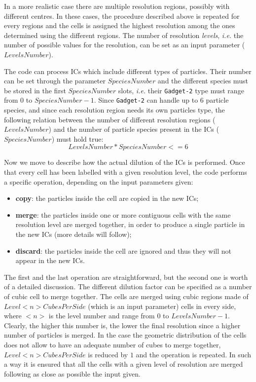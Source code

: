\documentclass[11pt,a4paper,titlepage]{article}
\newcommand{\ie}{\emph{i.e.}\xspace}
\newcommand{\gadget}{\texttt{Gadget-2}\xspace}
\begin{document}
In a more realistic case there are multiple resolution regions, possibly with different centres. In these cases, the procedure described above is repeated for every regions and the cells is assigned the highest resolution among the ones determined using the different regions. The number of resolution \emph{levels}, \ie the number of possible values for the resolution, can be set as an input parameter ($LevelsNumber$).

The code can process ICs which include different types of particles. Their number can be set through the parameter $SpeciesNumber$ and the different species must be stored in the first $SpeciesNumber$ slots, \ie their \gadget type must range from $0$ to $SpeciesNumber - 1$. Since \gadget can handle up to 6 particle species, and since each resolution region needs its own particles type, the following relation between the number of different resolution regions ($LevelsNumber$) and the number of particle species present in the ICs ($SpeciesNumber$) must hold true:
$$LevelsNumber * SpeciesNumber <= 6$$

Now we move to describe how the actual dilution of the ICs is performed. Once that every cell has been labelled with a given resolution level, the code performs a specific operation, depending on the input parameters given:
\begin{itemize}
\item \textbf{copy}: the particles inside the cell are copied in the new ICs;
\item \textbf{merge}: the particles inside one or more contiguous cells with the same resolution level are merged together, in order to produce a single particle in the new ICs (more details will follow);
\item \textbf{discard}: the particles inside the cell are ignored and thus they will not appear in the new ICs.
\end{itemize}

The first and the last operation are straightforward, but the second one is worth of a detailed discussion. The different dilution factor can be specified as a number of cubic cell to merge together. The cells are merged using cubic regions made of $Level<n>CubesPerSide$ (which is an input parameter) cells in every side, where $<n>$ is the level number and range from $0$ to $LevelsNumber - 1$. Clearly, the higher this number is, the lower the final resolution since a higher number of particles is merged. In the case the geometric distribution of the cells does not allow to have an adequate number of cubes to merge together, $Level<n>CubesPerSide$ is reduced by $1$ and the operation is repeated. In such a way it is ensured that all the cells with a given level of resolution are merged following as close as possible the input given.
\end{document}
